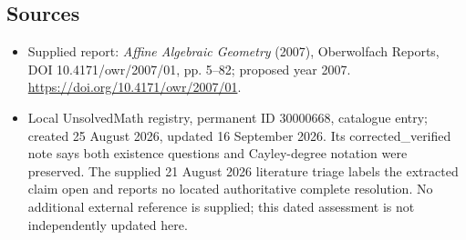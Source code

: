\documentclass[11pt]{article}
\begin{document}
\subsection{Sources}
\begin{itemize}
\item Supplied report: \emph{Affine Algebraic Geometry} (2007), Oberwolfach Reports, DOI 10.4171/owr/2007/01, pp. 5--82; proposed year 2007. \url{https://doi.org/10.4171/owr/2007/01}.
\item Local UnsolvedMath registry, permanent ID 30000668, catalogue entry; created 25 August 2026, updated 16 September 2026. Its corrected\_verified note says both existence questions and Cayley-degree notation were preserved. The supplied 21 August 2026 literature triage labels the extracted claim open and reports no located authoritative complete resolution. No additional external reference is supplied; this dated assessment is not independently updated here.
\end{itemize}
\end{document}
